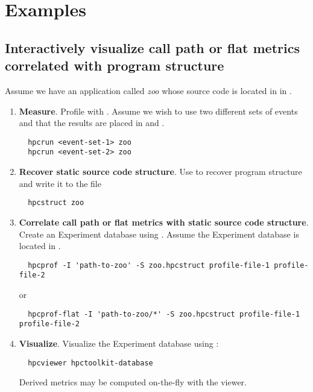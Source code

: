 \documentclass[english]{article}
\begin{document}
\section{Examples}

\subsection{Interactively visualize call path or flat metrics correlated with program structure}

Assume we have an application called \emph{zoo} whose source code is located in in .

\begin{enumerate}
\item \textbf{Measure}.
Profile with .  Assume we wish to use two different sets of events and that the results are placed in  and .
\begin{verbatim}
  hpcrun <event-set-1> zoo
  hpcrun <event-set-2> zoo
\end{verbatim}

\item \textbf{Recover static source code structure}. 
Use  to recover program structure and write it to the file 
\begin{verbatim}
  hpcstruct zoo
\end{verbatim}

\item \textbf{Correlate call path or flat metrics with static source code structure}.
Create an Experiment database using .  Assume the Experiment database is located in .
\begin{verbatim}
  hpcprof -I 'path-to-zoo' -S zoo.hpcstruct profile-file-1 profile-file-2
\end{verbatim}
or
\begin{verbatim}
  hpcprof-flat -I 'path-to-zoo/*' -S zoo.hpcstruct profile-file-1 profile-file-2
\end{verbatim}

\item \textbf{Visualize}.
Visualize the Experiment database using :
\begin{verbatim}
  hpcviewer hpctoolkit-database
\end{verbatim}
Derived metrics may be computed on-the-fly with the viewer.

\end{enumerate}
\end{document}
